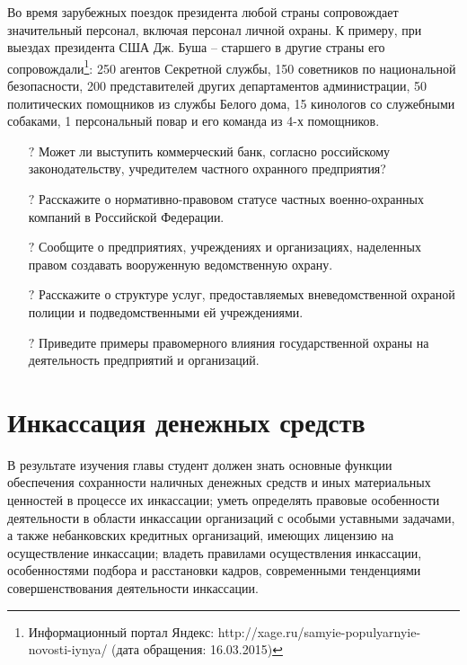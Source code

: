 \documentclass[a4paper,12pt,fleqn]{article} %
\begin{document}
Во время зарубежных поездок президента любой страны сопровождает значительный персонал, включая персонал личной охраны. К примеру, при выездах президента США Дж. Буша – старшего в другие страны его сопровождали\footnote{Информационный портал Яндекс: http://xage.ru/samyie-populyarnyie-novosti-iynya/ (дата обращения: 16.03.2015)}: 250 агентов Секретной службы, 150 советников по национальной безопасности, 200 представителей других департаментов администрации, 50 политических помощников из службы Белого дома, 15 кинологов со служебными собаками, 1 персональный повар и его команда из 4-х помощников.\\

\begin{tcolorbox}[colback=blue!40!red!1!,colframe=blue!40!red,enforce breakable,%
	pad at break=1mm, title=Вопросы и задания для самоконтроля]
	\begin{itemize}
		\item[{\color{blue!55!red}\Huge { $ ? $}} ]  Может ли выступить коммерческий банк, согласно российскому законодательству, учредителем частного охранного предприятия?
		\item[{\color{blue!55!red}\Huge {  $ ? $}} ] Расскажите о нормативно-правовом статусе частных военно-охранных компаний в Российской Федерации.
		\item[{\color{blue!55!red}\Huge {  $ ? $}} ] Сообщите о предприятиях, учреждениях и организациях, наделенных правом создавать вооруженную ведомственную охрану.
		\item[{\color{blue!55!red}\Huge {  $ ? $}} ] Расскажите о структуре услуг, предоставляемых вневедомственной охраной полиции и подведомственными ей учреждениями.
		\item[{\color{blue!55!red}\Huge {  $ ? $}} ] Приведите примеры правомерного влияния государственной охраны на деятельность предприятий и организаций.
	\end{itemize}		
\end{tcolorbox}

\section{Инкассация денежных средств}

\begin{tcolorbox}[colback=blue!40!red!10!,colframe=blue!40!red]
В результате изучения главы студент должен знать основные функции обеспечения сохранности наличных денежных средств и иных материальных ценностей в процессе их инкассации; уметь определять правовые особенности деятельности в  области инкассации организаций с особыми уставными задачами, а также небанковских кредитных организаций, имеющих лицензию на осуществление инкассации; владеть правилами осуществления инкассации, особенностями подбора и расстановки кадров, современными тенденциями совершенствования деятельности инкассации.
\end{tcolorbox}
\end{document}
